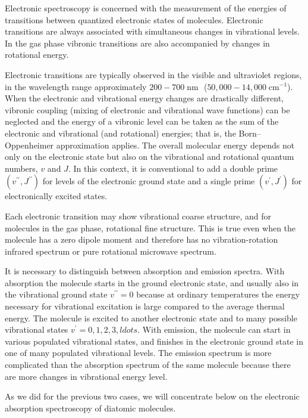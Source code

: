 \documentclass[
  9pt,
]{extbook}
\theoremstyle{definition}
\theoremstyle{definition}
\theoremstyle{definition}
\theoremstyle{remark}
\begin{document}
Electronic spectroscopy is concerned with the measurement of the energies of transitions between quantized electronic states of molecules. Electronic transitions are always associated with simultaneous changes in vibrational levels. In the gas phase vibronic transitions are also accompanied by changes in rotational energy.

Electronic transitions are typically observed in the visible and ultraviolet regions, in the wavelength range approximately \(200-700\; \text{nm }\) (\(50,000-14,000\; \text{cm}^{-1}\)). When the electronic and vibrational energy changes are drastically different, vibronic coupling (mixing of electronic and vibrational wave functions) can be neglected and the energy of a vibronic level can be taken as the sum of the electronic and vibrational (and rotational) energies; that is, the Born--Oppenheimer approximation applies. The overall molecular energy depends not only on the electronic state but also on the vibrational and rotational quantum numbers, \(v\) and \(J\). In this context, it is conventional to add a double prime \(\left(v^{\prime\prime},J^{\prime\prime}\right)\) for levels of the electronic ground state and a single prime \(\left(v^{\prime},J^{\prime}\right)\) for electronically excited states.

Each electronic transition may show vibrational coarse structure, and for molecules in the gas phase, rotational fine structure. This is true even when the molecule has a zero dipole moment and therefore has no vibration-rotation infrared spectrum or pure rotational microwave spectrum.

It is necessary to distinguish between absorption and emission spectra. With absorption the molecule starts in the ground electronic state, and usually also in the vibrational ground state \(v^{\prime\prime}=0\) because at ordinary temperatures the energy necessary for vibrational excitation is large compared to the average thermal energy. The molecule is excited to another electronic state and to many possible vibrational states \(v^{\prime}=0,1,2,3,ldots\). With emission, the molecule can start in various populated vibrational states, and finishes in the electronic ground state in one of many populated vibrational levels. The emission spectrum is more complicated than the absorption spectrum of the same molecule because there are more changes in vibrational energy level.

As we did for the previous two cases, we will concentrate below on the electronic absorption spectroscopy of diatomic molecules.
\end{document}
